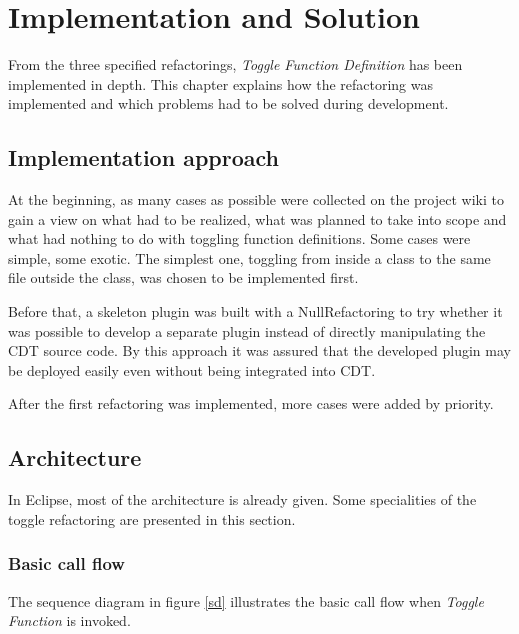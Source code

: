 \chapter{Implementation and Solution}
\thispagestyle{fancy}

From the three specified refactorings, \textit{Toggle Function Definition} has 
been implemented in depth. This chapter explains how the refactoring was 
implemented and which problems had to be solved during development.

\section{Implementation approach}

At the beginning, as many cases as possible were collected on the project wiki 
to gain a view on what had to be realized, what was planned to take into scope 
and what had nothing to do with toggling function definitions. Some cases were 
simple, some exotic. The simplest one, toggling from inside a class to the same 
file outside the class, was chosen to be implemented first. 

Before that, a skeleton plugin was built with a NullRefactoring to try whether 
it was possible to develop a separate plugin instead of directly manipulating 
the CDT source code. By this approach it was assured that the developed plugin 
may be deployed easily even without being integrated into CDT.

After the first refactoring was implemented, more cases were added by priority. 

\section{Architecture}

In Eclipse, most of the architecture is already given. Some specialities of the 
toggle refactoring are presented in this section.

\subsection{Basic call flow}
The sequence diagram in figure \ref{sd} illustrates the basic call flow when 
\textit{Toggle Function} is invoked.

